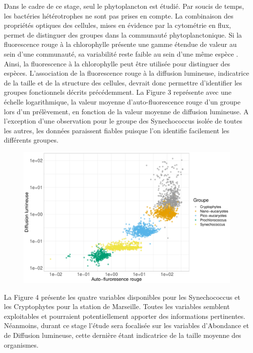 \documentclass[12pt]{article}
\begin{document}
Dans le cadre de ce stage, seul le phytoplancton est étudié. Par soucis de temps, les bactéries hétérotrophes ne sont pas prises en compte. 
La combinaison des propriétés optiques des cellules, mises en évidence par la cytométrie en flux, permet de distinguer des groupes dans la communauté phytoplanctonique. Si la fluorescence rouge à la chlorophylle présente une gamme étendue de valeur au sein d’une communauté, sa variabilité reste faible au sein d’une même espèce \citet{Trask1982}. Ainsi, la fluorescence à la chlorophylle peut être utilisée pour distinguer des espèces. L’association de la fluorescence rouge à la diffusion lumineuse, indicatrice de la taille et de la structure des cellules, devrait donc permettre d’identifier les groupes fonctionnels décrits précédemment. La Figure 3 représente avec une échelle logarithmique, la valeur moyenne d’auto-fluorescence rouge d’un groupe lors d’un prélèvement, en fonction de la valeur moyenne de diffusion lumineuse.  A l’exception d’une observation pour le groupe des Synechococcus isolée de toutes les autres, les données paraissent fiables puisque l'on identifie facilement les différents groupes. 

\begin{figure}
\centering
\includegraphics[width=.75\textwidth]{fig/MM_visualisation_phyto.pdf}
\caption{}
\end{figure}


La Figure 4 présente les quatre variables disponibles pour les Synechococcus et les Cryptophytes pour la station de Marseille. Toutes les variables semblent exploitables et pourraient potentiellement apporter des informations pertinentes. Néanmoins, durant ce stage l’étude sera focalisée sur les variables d’Abondance et de Diffusion lumineuse, cette dernière étant indicatrice de la taille moyenne des organismes. 
\end{document}

